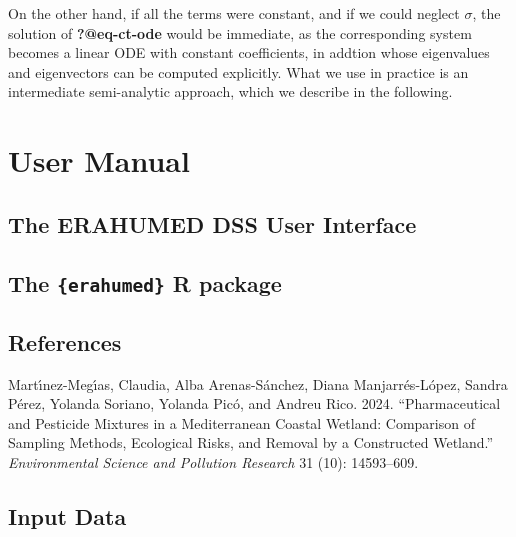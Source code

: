 \documentclass[
  letterpaper,
  DIV=11,
  numbers=noendperiod]{scrreprt}
\newlength{\cslhangindent}
\newenvironment{CSLReferences}[2] %
 {\begin{list}{}{%
  \setlength{\itemindent}{0pt}
  \setlength{\leftmargin}{0pt}
  \setlength{\parsep}{0pt}
  \ifodd #1
   \setlength{\leftmargin}{\cslhangindent}
   \setlength{\itemindent}{-1\cslhangindent}
  \fi
  \setlength{\itemsep}{#2\baselineskip}}}
 {\end{list}}
\begin{document}
On the other hand, if all the terms were constant, and if we could
neglect \(\sigma\), the solution of \textbf{?@eq-ct-ode} would be
immediate, as the corresponding system becomes a linear ODE with
constant coefficients, in addtion whose eigenvalues and eigenvectors can
be computed explicitly. What we use in practice is an intermediate
semi-analytic approach, which we describe in the following.

\part{User Manual}

\chapter{The ERAHUMED DSS User
Interface}\label{the-erahumed-dss-user-interface}

\chapter{\texorpdfstring{The \texttt{\{erahumed\}} R
package}{The \{erahumed\} R package}}\label{the-erahumed-r-package}


\chapter*{References}\label{references}


\label{refs}
\begin{CSLReferences}{1}{0}
Martı́nez-Megı́as, Claudia, Alba Arenas-Sánchez, Diana Manjarrés-López,
Sandra Pérez, Yolanda Soriano, Yolanda Picó, and Andreu Rico. 2024.
{``Pharmaceutical and Pesticide Mixtures in a Mediterranean Coastal
Wetland: Comparison of Sampling Methods, Ecological Risks, and Removal
by a Constructed Wetland.''} \emph{Environmental Science and Pollution
Research} 31 (10): 14593--609.

\end{CSLReferences}

\cleardoublepage
{}
{}
\appendix

\chapter{Input Data}\label{input-data}
\end{document}
